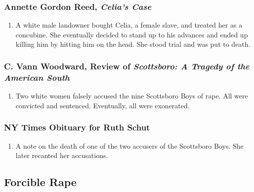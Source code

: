 \subsubsection{Annette Gordon Reed, \emph{Celia's Case}}

\begin{enumerate}
    \item A white male landowner bought Celia, a female slave, and treated her 
    as a concubine. She eventually decided to stand up to his advances and 
    ended up killing him by hitting him on the head. She stood trial and was 
    put to death.
\end{enumerate}

\subsubsection{C. Vann Woodward, Review of \emph{Scottsboro: A Tragedy of the 
American South}}

\begin{enumerate}
    \item Two white women falsely accused the nine Scottsboro Boys of rape.  
    All were convicted and sentenced. Eventually, all were exonerated.
\end{enumerate}

\subsubsection{NY Times Obituary for Ruth Schut}

\begin{enumerate}
    \item A note on the death of one of the two accusers of the Scottsboro 
    Boys. She later recanted her accusations.
\end{enumerate}

\subsection{Forcible Rape}

